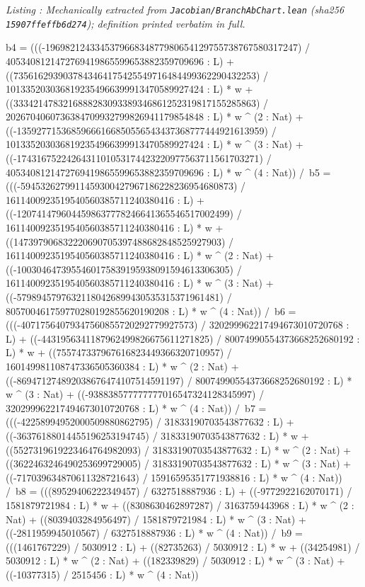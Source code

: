 \documentclass[a4paper,11pt]{article}
\newcounter{leanlisting}
\newenvironment{leanlisting}[2]{%
  \refstepcounter{leanlisting}\label{#2}%
  \begin{center}\textit{\small\color{inksecondary}Listing \theleanlisting: #1}\end{center}%
  \Verbatim[breaklines=true,breakanywhere=true,fontsize=\footnotesize,frame=single,framesep=4pt,rulecolor=\color{borderstrong},fillcolor=\color{bgsubtle}]%
}{%
  \endVerbatim%
}
\theoremstyle{jsplain}
\theoremstyle{jsdef}
\theoremstyle{jsrem}
\begin{document}
\begin{leanlisting}{Mechanically extracted from \texttt{Jacobian/BranchAbChart.lean} (sha256 \texttt{15907ffeffb6d274}); definition printed verbatim in full.}{ab:lst:def-chartclass}
      b4 = (((-196982124334537966834877980654129755738767580317247) / 4053408121472769419865599653882359709696 : L) + ((7356162939037843464175425549716484499362290432253) / 1013352030368192354966399913470589927424 : L) * w + ((3334214783216888283093389346861252319817155285863) / 2026704060736384709932799826941179854848 : L) * w ^ (2 : Nat) + ((-13592771536859666166850556543437368777444921613959) / 1013352030368192354966399913470589927424 : L) * w ^ (3 : Nat) + ((-1743167522426431101053174423220977563711561703271) / 4053408121472769419865599653882359709696 : L) * w ^ (4 : Nat)) /\
      b5 = (((-5945326279911459300427967186228236954680873) / 1611400923519540560385711240380416 : L) + ((-1207414796044598637778246641365546517002499) / 1611400923519540560385711240380416 : L) * w + ((147397906832220690705397488682848525927903) / 1611400923519540560385711240380416 : L) * w ^ (2 : Nat) + ((-1003046473955460175839195938091594613306305) / 1611400923519540560385711240380416 : L) * w ^ (3 : Nat) + ((-57989457976321180426899430535315371961481) / 805700461759770280192855620190208 : L) * w ^ (4 : Nat)) /\
      b6 = (((-40717564079347560855720292779927573) / 320299962217494673010720768 : L) + ((-4431956341187962499826675611271825) / 80074990554373668252680192 : L) * w + ((755747337967616823449366320710957) / 160149981108747336505360384 : L) * w ^ (2 : Nat) + ((-869471274892038676474107514591197) / 80074990554373668252680192 : L) * w ^ (3 : Nat) + ((-938838577777777016547324128345997) / 320299962217494673010720768 : L) * w ^ (4 : Nat)) /\
      b7 = (((-42258994952000509880862795) / 31833190703543877632 : L) + ((-36376188014455196253194745) / 31833190703543877632 : L) * w + ((5527319619223464764982093) / 31833190703543877632 : L) * w ^ (2 : Nat) + ((3622463246490253699729005) / 31833190703543877632 : L) * w ^ (3 : Nat) + ((-717039634870611328721643) / 15916595351771938816 : L) * w ^ (4 : Nat)) /\
      b8 = (((89529406222349457) / 6327518887936 : L) + ((-9772922162070171) / 1581879721984 : L) * w + ((8308630462897287) / 3163759443968 : L) * w ^ (2 : Nat) + ((8039403284956497) / 1581879721984 : L) * w ^ (3 : Nat) + ((-2811959945010567) / 6327518887936 : L) * w ^ (4 : Nat)) /\
      b9 = (((1461767229) / 5030912 : L) + ((82735263) / 5030912 : L) * w + ((34254981) / 5030912 : L) * w ^ (2 : Nat) + ((182339829) / 5030912 : L) * w ^ (3 : Nat) + ((-10377315) / 2515456 : L) * w ^ (4 : Nat))
\end{leanlisting}
\end{document}
